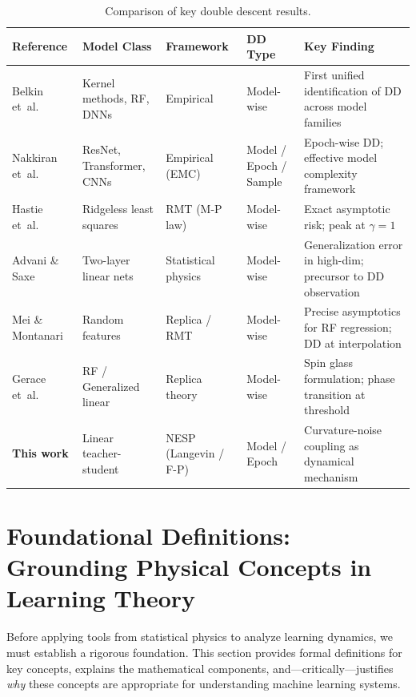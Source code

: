 \documentclass[
  journal=largetwo,
  simfonts=false,
  year=2025,
  volume=37,
]{cup-journal}
\begin{document}
\begin{table}[htb]
\centering
\footnotesize
\caption{Comparison of key double descent results.}
\label{tab:dd_comparison}
\begin{tabular}{ p{3.2cm}p{2.8cm}p{2.8cm}p{1.8cm}p{4cm} }
\toprule
\textbf{Reference} & \textbf{Model Class} & \textbf{Framework} & \textbf{DD Type} & \textbf{Key Finding} \\
\midrule
Belkin et~al.\ \cite{belkin_reconciling_2019} & Kernel methods, RF, DNNs & Empirical & Model-wise & First unified identification of DD across model families \\
\addlinespace[2pt]
Nakkiran et~al.\ \cite{nakkiran_deep_2019} & ResNet, Transformer, CNNs & Empirical (EMC) & Model / Epoch / Sample & Epoch-wise DD; effective model complexity framework \\
\addlinespace[2pt]
Hastie et~al.\ \cite{hastie2019surprises} & Ridgeless least squares & RMT (M-P law) & Model-wise & Exact asymptotic risk; peak at $\gamma=1$ \\
\addlinespace[2pt]
Advani \& Saxe \cite{advani2017highdimensionaldynamicsgeneralizationerror} & Two-layer linear nets & Statistical physics & Model-wise & Generalization error in high-dim; precursor to DD observation \\
\addlinespace[2pt]
Mei \& Montanari \cite{mei2020generalizationerrorrandomfeatures} & Random features & Replica / RMT & Model-wise & Precise asymptotics for RF regression; DD at interpolation \\
\addlinespace[2pt]
Gerace et~al.\ \cite{gerace2020generalisation} & RF / Generalized linear & Replica theory & Model-wise & Spin glass formulation; phase transition at threshold \\
\addlinespace[2pt]
\textbf{This work} & Linear teacher-student & NESP (Langevin / F-P) & Model / Epoch & Curvature-noise coupling as dynamical mechanism \\
\bottomrule
\end{tabular}
\end{table}

\section{Foundational Definitions: Grounding Physical Concepts in Learning Theory}\label{sec:foundational_defs}

Before applying tools from statistical physics to analyze learning dynamics, we must establish a rigorous foundation. This section provides formal definitions for key concepts, explains the mathematical components, and---critically---justifies \textit{why} these concepts are appropriate for understanding machine learning systems.
\end{document}
